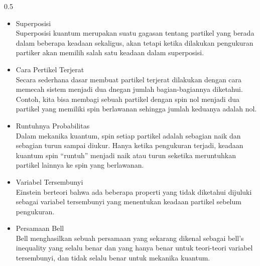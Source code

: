 \begin{frame}
\begin{columns}
        \begin{column}{0.5\textwidth} \vspace{-0.3cm}%
            \justifying %
            \tiny %
                \begin{itemize}
                \item Superposisi\\
                    Superposisi kuantum merupakan suatu gagasan tentang partikel yang berada dalam beberapa keadaan sekaligus, akan tetapi ketika dilakukan pengukuran partiker akan memilih salah satu keadaan dalam superposisi.
                \item Cara Pertikel Terjerat\\
                    Secara sederhana dasar membuat partikel terjerat dilakukan dengan cara memecah sistem menjadi dua dnegan jumlah bagian-bagiannya diketahui. Contoh, kita bisa membagi sebuah partikel dengan spin nol menjadi dua partikel yang memiliki spin berlawanan sehingga jumlah keduanya adalah nol. 
                \item Runtuhnya Probabilitas\\
                    Dalam mekanika kuantum, spin setiap partikel adalah sebagian naik dan sebagian turun sampai diukur. Hanya ketika pengukuran terjadi, keadaan kuantum spin “runtuh” menjadi naik atau turun seketika meruntuhkan partikel lainnya ke spin yang berlawanan. 
                \item Variabel Tersembunyi\\
                    Einstein berteori bahwa ada beberapa properti yang tidak diketahui dijuluki sebagai variabel tersembunyi yang menentukan keadaan partikel sebelum pengukuran.
                \item  Persamaan Bell\\
                    Bell menghasilkan sebuah persamaan yang sekarang dikenal sebagai bell's inequality yang selalu benar dan yang hanya benar untuk teori-teori variabel tersembunyi, dan tidak selalu benar untuk mekanika kuantum.  
                \end{itemize}
        \end{column}
    \end{columns}
\end{frame}